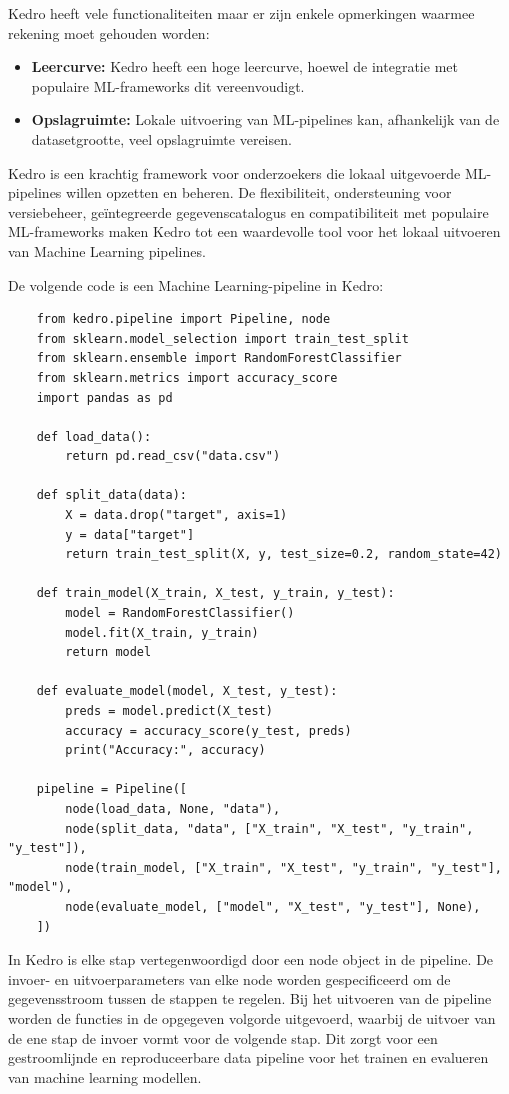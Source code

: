 Kedro heeft vele functionaliteiten maar er zijn enkele opmerkingen waarmee rekening moet gehouden worden:

\begin{itemize}
    \item \textbf{Leercurve:} Kedro heeft een hoge leercurve, hoewel de integratie met populaire ML-frameworks dit vereenvoudigt.
    \item \textbf{Opslagruimte:} Lokale uitvoering van ML-pipelines kan, afhankelijk van de datasetgrootte, veel opslagruimte vereisen.
\end{itemize}

Kedro is een krachtig framework voor onderzoekers die lokaal uitgevoerde ML-pipelines willen opzetten en beheren. De flexibiliteit, ondersteuning voor versiebeheer, geïntegreerde gegevenscatalogus en compatibiliteit met populaire ML-frameworks maken Kedro tot een waardevolle tool voor het lokaal uitvoeren van Machine Learning pipelines.

De volgende code is een Machine Learning-pipeline in Kedro: 

\begin{verbatim}
    from kedro.pipeline import Pipeline, node
    from sklearn.model_selection import train_test_split
    from sklearn.ensemble import RandomForestClassifier
    from sklearn.metrics import accuracy_score
    import pandas as pd

    def load_data():
        return pd.read_csv("data.csv")

    def split_data(data):
        X = data.drop("target", axis=1)
        y = data["target"]
        return train_test_split(X, y, test_size=0.2, random_state=42)

    def train_model(X_train, X_test, y_train, y_test):
        model = RandomForestClassifier()
        model.fit(X_train, y_train)
        return model

    def evaluate_model(model, X_test, y_test):
        preds = model.predict(X_test)
        accuracy = accuracy_score(y_test, preds)
        print("Accuracy:", accuracy)

    pipeline = Pipeline([
        node(load_data, None, "data"),
        node(split_data, "data", ["X_train", "X_test", "y_train", "y_test"]),
        node(train_model, ["X_train", "X_test", "y_train", "y_test"], "model"),
        node(evaluate_model, ["model", "X_test", "y_test"], None),
    ])
\end{verbatim}
In Kedro is elke stap vertegenwoordigd door een node object in de pipeline. De invoer- en uitvoerparameters van elke node worden gespecificeerd om de gegevensstroom tussen de stappen te regelen. Bij het uitvoeren van de pipeline worden de functies in de opgegeven volgorde uitgevoerd, waarbij de uitvoer van de ene stap de invoer vormt voor de volgende stap. Dit zorgt voor een gestroomlijnde en reproduceerbare data pipeline voor het trainen en evalueren van machine learning modellen.
